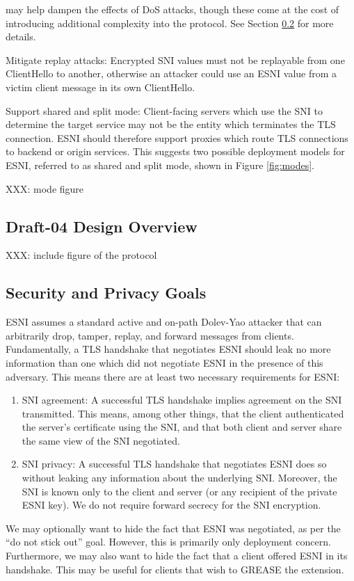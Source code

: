 \documentclass[twoside]{article}
\theoremstyle{definition}
\begin{document}
\begin{compactitem}
  may help dampen the effects of DoS attacks, though these come at the cost of introducing
  additional complexity into the protocol. See Section \ref{sec:security} for more details.
  \item Mitigate replay attacks: Encrypted SNI values must not be replayable from one 
  ClientHello to another, otherwise an attacker could use an ESNI value from a victim client
  message in its own ClientHello.
  \item Support shared and split mode: Client-facing servers which use the SNI to determine 
  the target service may not be the entity which terminates the TLS connection. ESNI should therefore
  support proxies which route TLS connections to backend or origin services. This suggests two
  possible deployment models for ESNI, referred to as shared and split mode, shown in Figure \ref{fig:modes}.
\end{compactitem}
%

XXX: mode figure

\subsection{Draft-04 Design Overview}
XXX: include figure of the protocol

\subsection{Security and Privacy Goals} \label{sec:security}
ESNI assumes a standard active and on-path Dolev-Yao attacker that can arbitrarily drop, tamper, 
replay, and forward messages from clients. Fundamentally, a TLS handshake that negotiates ESNI should 
leak no more information than one which did not negotiate ESNI in the presence of this adversary. 
This means there are at least two necessary requirements for ESNI:
%
\begin{enumerate}
  \item SNI agreement: A successful TLS handshake implies agreement on the SNI transmitted. This means, among 
  other things, that the client authenticated the server's certificate using the SNI, and that both client and 
  server share the same view of the SNI negotiated.
  \item SNI privacy: A successful TLS handshake that negotiates ESNI does so without leaking any information 
  about the underlying SNI. Moreover, the SNI is known only to the client and server (or any recipient of the
  private ESNI key). We do not require forward secrecy for the SNI encryption.
\end{enumerate}
%
We may optionally want to hide the fact that ESNI was negotiated, as per the ``do not stick out'' goal. However, 
this is primarily only deployment concern. Furthermore, we may also want to hide the fact that a client offered
ESNI in its handshake. This may be useful for clients that wish to GREASE \cite{XXX} the extension.
\end{document}
